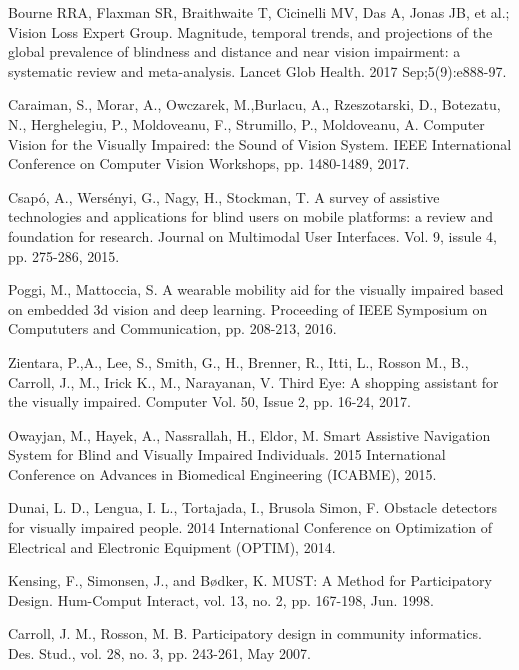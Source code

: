 \documentclass[10pt,conference,compsocconf]{IEEEtran}
\begin{document}
\begin{thebibliography}{1}

 Bourne RRA, Flaxman SR, Braithwaite T, Cicinelli MV, Das A, Jonas JB, et al.; Vision Loss Expert Group. Magnitude, temporal trends, and projections of the global prevalence of blindness and distance and near vision impairment: a systematic review and meta-analysis. Lancet Glob Health.  2017 Sep;5(9):e888-97.


 Caraiman, S., Morar, A., Owczarek, M.,Burlacu, A., Rzeszotarski, D., Botezatu, N., Herghelegiu, P., Moldoveanu, F., Strumillo, P., Moldoveanu, A. Computer Vision for the Visually Impaired: the Sound of Vision System. IEEE International Conference on Computer Vision Workshops, pp. 1480-1489, 2017.

 Csap\'{o}, A., Wers\'{e}nyi, G., Nagy, H., Stockman, T. A survey of assistive technologies and applications for blind users on mobile platforms: a review and foundation for research. Journal on Multimodal User Interfaces. Vol. 9, issule 4,  pp. 275-286, 2015.


 Poggi, M., Mattoccia, S. A wearable mobility aid for the visually impaired based on embedded 3d vision and deep learning. Proceeding of IEEE Symposium on Compututers and Communication, pp. 208-213, 2016.

 Zientara, P.,A., Lee, S., Smith, G., H., Brenner, R., Itti, L., Rosson M., B., Carroll, J., M., Irick K., M., Narayanan, V. Third Eye: A shopping assistant for the visually impaired. Computer Vol. 50, Issue 2, pp. 16-24, 2017.


 Owayjan, M., Hayek, A., Nassrallah, H., Eldor, M. Smart Assistive Navigation System for Blind and Visually Impaired Individuals. 2015 International Conference on Advances in Biomedical Engineering (ICABME), 2015.

 Dunai, L. D., Lengua, I. L., Tortajada, I., Brusola Simon, F. Obstacle detectors for visually impaired people. 2014 International Conference on Optimization of Electrical and Electronic Equipment (OPTIM), 2014.

 Kensing, F., Simonsen, J., and B\o dker, K. MUST: A Method for Participatory Design. Hum-Comput Interact, vol. 13, no. 2, pp. 167-198, Jun. 1998.


 Carroll, J. M., Rosson, M. B. Participatory design in community informatics. Des. Stud., vol. 28, no. 3, pp. 243-261, May 2007.



\end{thebibliography}
\end{document}
